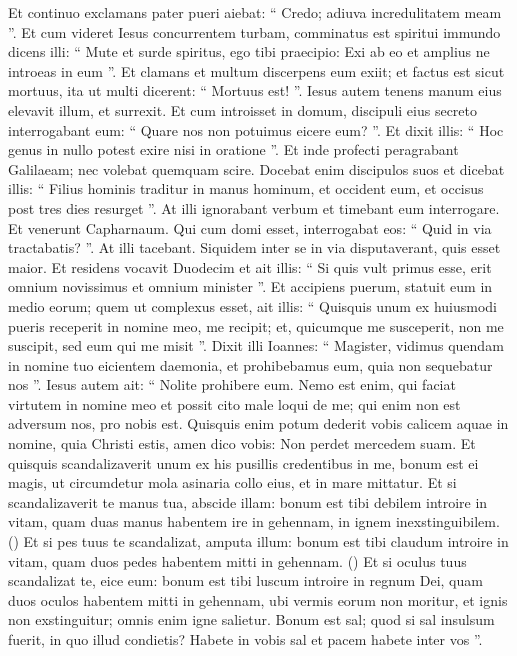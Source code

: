 \begin{biblechapter}
\begin{biblechapter}
\begin{biblechapter}
\begin{biblechapter}
\begin{biblechapter}
\begin{biblechapter}
\begin{biblechapter}
\begin{biblechapter}
\begin{biblechapter}
\verse Et continuo exclamans pater pueri aiebat: “ Credo; adiuva incredulitatem meam ”. 
 \verse Et cum videret Iesus concurrentem turbam, comminatus est spiritui immundo dicens illi: “ Mute et surde spiritus, ego tibi praecipio: Exi ab eo et amplius ne introeas in eum ”. 
\verse Et clamans et multum discerpens eum exiit; et factus est sicut mortuus, ita ut multi dicerent: “ Mortuus est! ”. 
\verse Iesus autem tenens manum eius elevavit illum, et surrexit.
 \verse Et cum introisset in domum, discipuli eius secreto interrogabant eum: “ Quare nos non potuimus eicere eum? ”. 
\verse Et dixit illis: “ Hoc genus in nullo potest exire nisi in oratione ”.
 \verse Et inde profecti peragrabant Galilaeam; nec volebat quemquam scire. 
\verse Docebat enim discipulos suos et dicebat illis: “ Filius hominis traditur in manus hominum, et occident eum, et occisus post tres dies resurget ”. 
\verse At illi ignorabant verbum et timebant eum interrogare.
 \verse Et venerunt Capharnaum. Qui cum domi esset, interrogabat eos: “ Quid in via tractabatis? ”. 
\verse At illi tacebant. Siquidem inter se in via disputaverant, quis esset maior. 
\verse Et residens vocavit Duodecim et ait illis: “ Si quis vult primus esse, erit omnium novissimus et omnium minister ”. 
\verse Et accipiens puerum, statuit eum in medio eorum; quem ut complexus esset, ait illis: 
\verse “ Quisquis unum ex huiusmodi pueris receperit in nomine meo, me recipit; et, quicumque me susceperit, non me suscipit, sed eum qui me misit ”.
 \verse Dixit illi Ioannes: “ Magister, vidimus quendam in nomine tuo eicientem daemonia, et prohibebamus eum, quia non sequebatur nos ”. 
\verse Iesus autem ait: “ Nolite prohibere eum. Nemo est enim, qui faciat virtutem in nomine meo et possit cito male loqui de me; 
\verse qui enim non est adversum nos, pro nobis est. 
\verse Quisquis enim potum dederit vobis calicem aquae in nomine, quia Christi estis, amen dico vobis: Non perdet mercedem suam.
 \verse Et quisquis scandalizaverit unum ex his pusillis credentibus in me, bonum est ei magis, ut circumdetur mola asinaria collo eius, et in mare mittatur.
 \verse Et si scandalizaverit te manus tua, abscide illam: bonum est tibi debilem introire in vitam, quam duas manus habentem ire in
 gehennam, in ignem inexstinguibilem. 
(\verse) \verse Et si pes tuus te scandalizat, amputa illum: bonum est tibi claudum introire in vitam,
 quam duos pedes habentem mitti in gehennam. 
(\verse) \verse Et si oculus tuus scandalizat te, eice eum: bonum est tibi luscum introire in regnum Dei, quam duos oculos habentem mitti in gehennam, 
\verse ubi vermis eorum non moritur, et ignis non exstinguitur; 
\verse omnis enim igne salietur. 
\verse Bonum est sal; quod si sal insulsum fuerit, in quo illud condietis? Habete in vobis sal et pacem habete inter vos ”.
 

\end{biblechapter}
\end{biblechapter}
\end{biblechapter}
\end{biblechapter}
\end{biblechapter}
\end{biblechapter}
\end{biblechapter}
\end{biblechapter}
\end{biblechapter}
